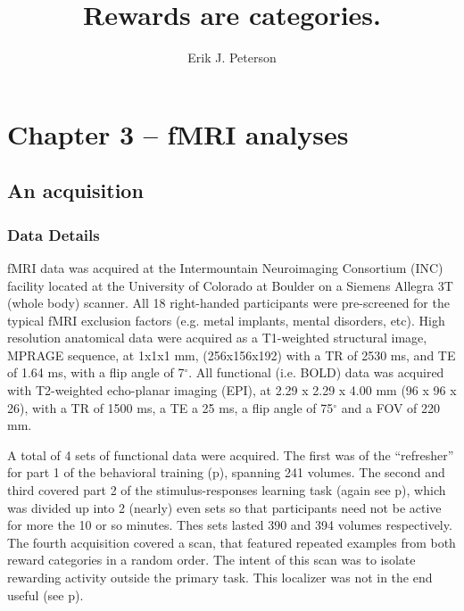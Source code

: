\documentclass[doc,12pt]{apa}        %
\title{Rewards are categories.}
\author{Erik J. Peterson} \affiliation{Dept. of Psychology \\ Colorado State University \\ Fort Collins, CO}
\begin{document}
 
\maketitle
\doublespacing

\section{Chapter 3 -- fMRI analyses} %
\label{sec:task_and_models}
\subsection{An acquisition}
\label{sub:acquired}
\subsubsection{Data Details}
\label{subsub:datadetails}
fMRI data was acquired at the Intermountain Neuroimaging Consortium (INC) facility located at the University of Colorado at Boulder on a Siemens Allegra 3T (whole body) scanner.  All 18 right-handed participants were pre-screened for the typical fMRI exclusion factors (e.g. metal implants, mental disorders, etc).  High resolution anatomical data were acquired as a T1-weighted structural image, MPRAGE sequence, at 1x1x1 mm, (256x156x192) with a TR of 2530 ms, and TE of 1.64 ms, with a flip angle of 7$^\circ$.  All functional (i.e. BOLD) data was acquired with T2-weighted echo-planar imaging (EPI), at 2.29 x 2.29 x 4.00 mm (96 x 96 x 26), with a TR of 1500 ms, a TE a 25 ms, a flip angle of 75$^\circ$ and a FOV of 220 mm.

A total of 4 sets of functional data were acquired.  The first was of the ``refresher'' for part 1 of the behavioral training (p\pageref{subsub:whatwhen}), spanning 241 volumes.  The second and third covered part 2 of the stimulus-responses learning task (again see p\pageref{subsub:whatwhen}), which was divided up into 2 (nearly) even sets so that participants need not be active for more the 10 or so minutes.  Thes sets lasted 390 and 394 volumes respectively.  The fourth acquisition covered a scan, that featured repeated examples from both reward categories in a random order.  The intent of this scan was to isolate rewarding activity outside the primary task. This localizer was not in the end useful (see p\pageref{subsub:chunks}).
\end{document}
